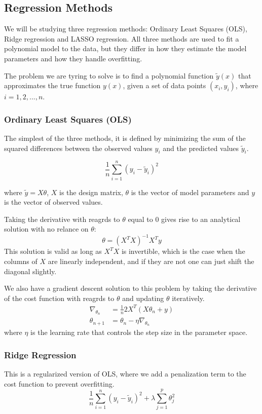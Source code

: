 \documentclass[amssymb,twocolumn,aps]{revtex4}
\begin{document}
\subsection{Regression Methods}
We will be studying three regression methods: Ordinary Least Squares (OLS), Ridge regression and LASSO regression.
All three methods are used to fit a polynomial model to the data, but they differ in how they estimate the model parameters and how they handle overfitting.

The problem we are tyring to solve is to find a polynomial function $\tilde{y}(x)$ that approximates the true function $y(x)$, given a set of data points $(x_i, y_i)$, where $i=1,2,...,n$.

\subsubsection{Ordinary Least Squares (OLS)}
The simplest of the three methods, it is defined by minimizing the sum of the squared differences between the observed values $y_i$ and the predicted values $\tilde{y}_i$.

$$\frac{1}{n} \sum_{i=1}^{n} (y_i - \tilde{y}_i)^2$$

where $\tilde{y} = X\theta$, $X$ is the design matrix, $\theta$ is the vector of model parameters and $y$ is the vector of observed values.

Taking the derivative with reagrds to $\theta$ equal to $0$ gives rise to an analytical solution with no relance on $\theta$:
\begin{equation}
  \theta = (X^TX)^{-1}X^Ty  
\end{equation}
This solution is valid as long as $X^TX$ is invertible, which is the case when the columns of $X$ are linearly independent, and if they are not one can just shift the diagonal slightly.

We also have a gradient descent solution to this problem by taking the derivative of the cost function with reagrds to $\theta$ and updating $\theta$ iteratively.
\begin{align}
\nabla_{\theta_n} &= \frac{1}{n}2X^T(X\theta_n + y) \\
\theta_{n+1} &= \theta_n - \eta \nabla_{\theta_n}
\end{align}
where $\eta$ is the learning rate that controls the step size in the parameter space.

\subsubsection{Ridge Regression}
This is a regularized version of OLS, where we add a penalization term to the cost function to prevent overfitting.
\begin{equation}
    \frac{1}{n} \sum_{i=1}^{n} (y_i - \tilde{y}_i)^2 + \lambda \sum_{j=1}^{p} \theta_j^2
\end{equation}
\end{document}
